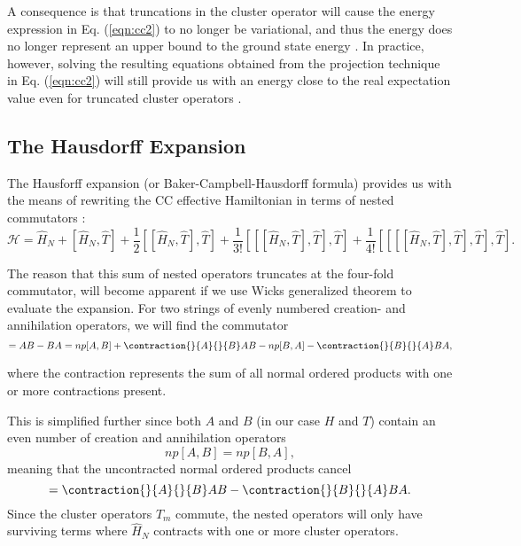 A consequence is that truncations in the cluster operator will cause
the energy expression in Eq. (\ref{eqn:cc2}) to no longer be
variational, and thus the energy does no longer represent an upper
bound to the ground state energy \cite{CrawfordSchaefer}. In practice,
however, solving the resulting equations obtained from the
projection technique in Eq. (\ref{eqn:cc2}) will still provide us
with an energy close to the real expectation value even for truncated
cluster operators \cite{CrawfordSchaefer}.

\subsection{The Hausdorff Expansion}

The Hausforff expansion (or Baker-Campbell-Hausdorff formula) provides
us with the means of rewriting the CC effective Hamiltonian in terms
of nested commutators \cite[p.293]{ShavittBartlett2009}:
\begin{equation}
\mathcal{H} = \hat{H}_N + [\hat{H}_N, \hat{T}] + \frac{1}{2} [[\hat{H}_N, \hat{T}], \hat{T}] +  \frac{1}{3!} [[[\hat{H}_N, \hat{T}], \hat{T}], \hat{T}] + \frac{1}{4!} [[[[\hat{H}_N, \hat{T}], \hat{T}], \hat{T}], \hat{T}].
\end{equation}

The reason that this sum of nested operators truncates at the
four-fold commutator, will become apparent if we use Wicks generalized
theorem to evaluate the expansion. For two strings of evenly numbered
creation- and annihilation operators, we will find the commutator
\begin{equation}
[A,B] = AB - BA = np[A,B] + 
\contraction{}{A}{}{B}
AB - np[B,A] - 
\contraction{}{B}{}{A}
BA,
\end{equation}

where the contraction represents the sum of all normal ordered products with one or more contractions present. 

This is simplified further since both $A$ and $B$ (in our case $H$ and
$T$) contain an even number of creation and annihilation operators
\begin{equation}
np[A,B] = np[B,A],
\end{equation}
meaning that  the uncontracted normal ordered products cancel
\begin{equation}
[A,B] =  
\contraction{}{A}{}{B}
AB - 
\contraction{}{B}{}{A}
BA.
\end{equation}
Since the cluster operators $T_m$ commute, the nested operators will
only have surviving terms where $\hat{H}_N$ contracts with one or more
cluster operators.

